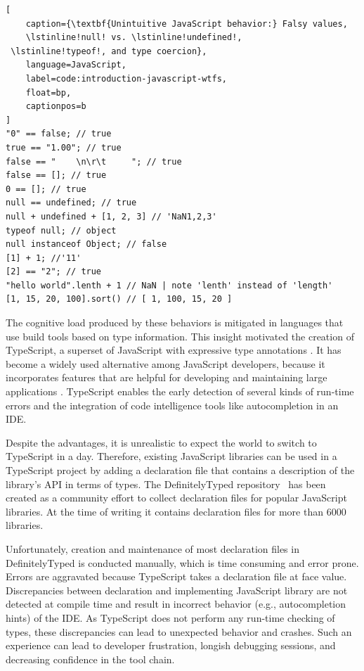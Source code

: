 \documentclass[english,cleveref,autoref,submission]{programming}
\begin{document}
\begin{lstlisting}[
    caption={\textbf{Unintuitive JavaScript behavior:} Falsy values,
    \lstinline!null! vs. \lstinline!undefined!,
 \lstinline!typeof!, and type coercion},
    language=JavaScript,
	label=code:introduction-javascript-wtfs,
    float=bp,
    captionpos=b
]
"0" == false; // true
true == "1.00"; // true
false == "    \n\r\t     "; // true
false == []; // true
0 == []; // true
null == undefined; // true
null + undefined + [1, 2, 3] // 'NaN1,2,3' 
typeof null; // object
null instanceof Object; // false
[1] + 1; //'11'
[2] == "2"; // true
"hello world".lenth + 1 // NaN | note 'lenth' instead of 'length'
[1, 15, 20, 100].sort() // [ 1, 100, 15, 20 ]
\end{lstlisting}

The cognitive load produced by these behaviors is mitigated in languages that use
build tools based on type information. This insight motivated the
creation of TypeScript, a superset of JavaScript with expressive type
annotations \cite{typescript}. It has become a widely used alternative
among JavaScript developers, because it incorporates features that are
helpful for developing and maintaining large applications
\cite{DBLP:conf/icse/GaoBB17}. TypeScript enables the early detection
of several kinds of run-time errors and the integration of code intelligence
tools like autocompletion in an IDE.

Despite the advantages, it is unrealistic to expect the world to
switch to TypeScript in a day. Therefore, 
existing JavaScript libraries can be used in a TypeScript project by
adding a declaration file that contains a description of the library's
API in terms of types. 
The DefinitelyTyped repository~\cite{definitely-typed-repository} has
been created as a community effort to collect declaration files for
popular JavaScript libraries. At the time of writing it contains
declaration files for more than 6000 libraries.

Unfortunately, creation and maintenance of most declaration
files in DefinitelyTyped is conducted manually,
which is time consuming and  error prone. Errors are aggravated because TypeScript takes a
declaration file at face value. Discrepancies between declaration and
implementing JavaScript library are not detected at 
compile time and result in incorrect behavior (e.g., autocompletion
hints) of the IDE. 
As TypeScript does not perform any run-time 
checking of types, these  discrepancies can lead to unexpected 
behavior and crashes. Such an experience can lead to developer
frustration, longish debugging sessions, and decreasing confidence in
the tool chain.
\end{document}

